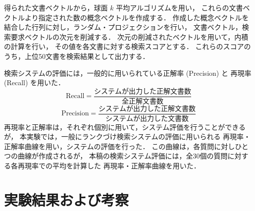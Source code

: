 得られた文書ベクトルから，球面 $k$ 平均アルゴリズムを用い，
これらの文書ベクトルより指定された数の概念ベクトルを作成する．
作成した概念ベクトルを結合した行列に対し，ランダム・プロジェクションを行い，
文書ベクトル，検索要求ベクトルの次元を削減する．
次元の削減されたベクトルを用いて，内積の計算を行い，
その値を各文書に対する検索スコアとする．
これらのスコアのうち，上位50文書を検索結果として出力する．

検索システムの評価には，一般的に用いられている正解率 (Precision) と
再現率 (Recall) を用いた\cite{lewis2}\cite{Witten}．
\begin{equation}
\mbox{Recall} = \frac{システムが出力した正解文書数}{全正解文書数}
\end{equation}
\begin{equation}
\mbox{Precision} = \frac{システムが出力した正解文書数}
{システムが出力した文書数}
\end{equation}
再現率と正解率は，それぞれ個別に用いて，システム評価を行うことができるが，
本実験では，一般にランクづけ検索システムの評価に用いられる
再現率・正解率曲線を用い，システムの評価を行った．
この曲線は，各質問に対しひとつの曲線が作成されるが，
本稿の検索システム評価には，全30個の質問に対する各再現率での平均を計算した
再現率・正解率曲線を用いた．

\vspace*{0.3cm}

\section{実験結果および考察}
